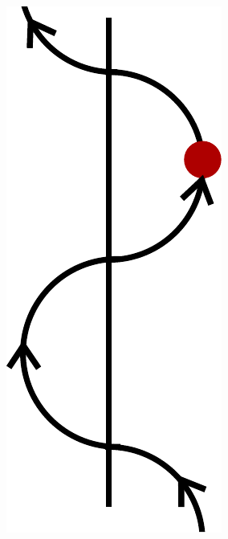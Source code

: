 \documentclass{beamer}
\begin{document}
\begin{frame}
\begin{figure}
        \hspace{2cm}
        \pause
        \includegraphics[scale=.5,align=c]{magnetic_snake.pdf}
     \end{figure}
\end{frame}
\end{document}
